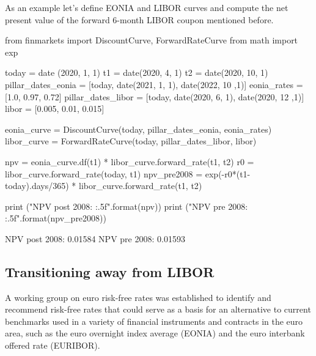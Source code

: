 %
%

As an example let's define EONIA and LIBOR curves and compute the net present value of the forward 6-month LIBOR coupon mentioned before.

\begin{ipython}
from finmarkets import DiscountCurve, ForwardRateCurve
from math import exp

today = date (2020, 1, 1)
t1 = date(2020, 4, 1)
t2 = date(2020, 10, 1)
pillar_dates_eonia = [today, date(2021, 1, 1), date(2022, 10 ,1)] 
eonia_rates = [1.0, 0.97, 0.72]
pillar_dates_libor = [today, date(2020, 6, 1), date(2020, 12 ,1)] 
libor = [0.005, 0.01, 0.015]

eonia_curve = DiscountCurve(today, pillar_dates_eonia, eonia_rates) 
libor_curve = ForwardRateCurve(today, pillar_dates_libor, libor) 

npv = eonia_curve.df(t1) * libor_curve.forward_rate(t1, t2)
r0 = libor_curve.forward_rate(today, t1)
npv_pre2008 = exp(-r0*(t1-today).days/365) * libor_curve.forward_rate(t1, t2)

print ("NPV post 2008: {:.5f}".format(npv))
print ("NPV pre 2008: {:.5f}".format(npv_pre2008))
\end{ipython}
\begin{ioutput}
NPV post 2008: 0.01584
NPV pre 2008: 0.01593
\end{ioutput}

\subsection{Transitioning away from LIBOR~\cite{bib:str}}
A working group on euro risk-free rates was established to identify and recommend risk-free rates that could serve as a basis for an alternative to current benchmarks used in a variety of financial
instruments and contracts in the euro area, such as the euro overnight index average (EONIA) and the euro interbank offered rate (EURIBOR). 

